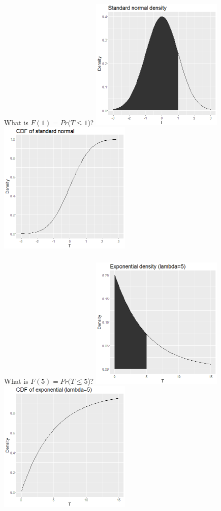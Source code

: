 \begin{frame}
\frametitle{\grp}
What is $F(1)=Pr(T\leq 1$)?
\vskip10pt
\includegraphics[width=0.48\textwidth]{Figures/shadednormalpdf.png}
\includegraphics[width=0.48\textwidth]{Figures/normalcdf.png}
\end{frame}


\begin{frame}
\frametitle{\grp}
What is $F(5)=Pr(T\leq 5$)?
\vskip10pt
\includegraphics[width=0.48\textwidth]{Figures/shadedexppdf.png}
\includegraphics[width=0.48\textwidth]{Figures/expcdf.png}
\end{frame}

